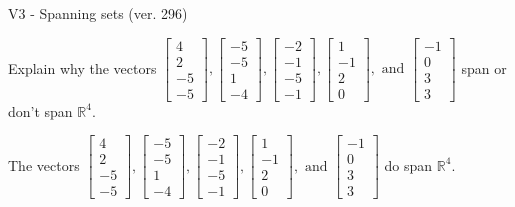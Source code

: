 \begin{exercise}
  \begin{exerciseTitle}V3 - Spanning sets (ver. 296)\end{exerciseTitle}
  \begin{exerciseStatement}
    Explain why the vectors \(\left[\begin{array}{r}
4 \\
2 \\
-5 \\
-5
\end{array}\right] , \left[\begin{array}{r}
-5 \\
-5 \\
1 \\
-4
\end{array}\right] , \left[\begin{array}{r}
-2 \\
-1 \\
-5 \\
-1
\end{array}\right] , \left[\begin{array}{r}
1 \\
-1 \\
2 \\
0
\end{array}\right] , \text{ and } \left[\begin{array}{r}
-1 \\
0 \\
3 \\
3
\end{array}\right]\) span or don't span \(\mathbb{R}^4\). 
	


  \end{exerciseStatement}
  \begin{exerciseAnswer}
   The vectors \(\left[\begin{array}{r}
4 \\
2 \\
-5 \\
-5
\end{array}\right] , \left[\begin{array}{r}
-5 \\
-5 \\
1 \\
-4
\end{array}\right] , \left[\begin{array}{r}
-2 \\
-1 \\
-5 \\
-1
\end{array}\right] , \left[\begin{array}{r}
1 \\
-1 \\
2 \\
0
\end{array}\right] , \text{ and } \left[\begin{array}{r}
-1 \\
0 \\
3 \\
3
\end{array}\right]\) 
  	 do  
	span \(\mathbb{R}^4\).
  



\end{exerciseAnswer}
\end{exercise}
